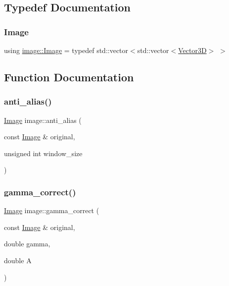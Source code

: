 \subsection{Typedef Documentation}
\mbox{\label{namespaceimage_af3f0dcb372dbc1b38ba87aae9e2c780c}} 
\subsubsection{\texorpdfstring{Image}{Image}}
{\footnotesize\ttfamily using \mbox{\hyperlink{namespaceimage_af3f0dcb372dbc1b38ba87aae9e2c780c}{image\+::\+Image}} = typedef std\+::vector$<$std\+::vector$<$\mbox{\hyperlink{classVector3D}{Vector3D}}$>$ $>$}



\subsection{Function Documentation}
\mbox{\label{namespaceimage_ae465266083a6ee29947db193e0881ff2}} 
\subsubsection{\texorpdfstring{anti\_alias()}{anti\_alias()}}
{\footnotesize\ttfamily \mbox{\hyperlink{namespaceimage_af3f0dcb372dbc1b38ba87aae9e2c780c}{Image}} image\+::anti\+\_\+alias (\begin{DoxyParamCaption}\item[{const \mbox{\hyperlink{namespaceimage_af3f0dcb372dbc1b38ba87aae9e2c780c}{Image}} \&}]{original,  }\item[{unsigned int}]{window\+\_\+size }\end{DoxyParamCaption})}

\mbox{\label{namespaceimage_a350994eafb0492e40cb74c116873a7ae}} 
\subsubsection{\texorpdfstring{gamma\_correct()}{gamma\_correct()}\hspace{0.1cm}{\footnotesize\ttfamily [1/2]}}
{\footnotesize\ttfamily \mbox{\hyperlink{namespaceimage_af3f0dcb372dbc1b38ba87aae9e2c780c}{Image}} image\+::gamma\+\_\+correct (\begin{DoxyParamCaption}\item[{const \mbox{\hyperlink{namespaceimage_af3f0dcb372dbc1b38ba87aae9e2c780c}{Image}} \&}]{original,  }\item[{double}]{gamma,  }\item[{double}]{A }\end{DoxyParamCaption})}




